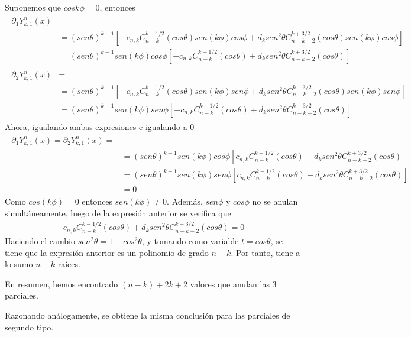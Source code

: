 Suponemos que $cos k\phi = 0 $, entonces
\begin{gather}
\begin{aligned}
 \partial_1  Y_{k,1}^n(x) &= \\ 
 &= (sen\theta)^{k-1}[-c_{n,k}C_{n-k}^{k-1/2}(cos \theta)sen(k\phi)cos\phi + d_k sen^2\theta C_{n-k-2}^{k+3/2}(cos \theta)sen(k\phi)cos\phi] \\ &= (sen\theta)^{k-1}sen(k\phi)cos\phi[-c_{n,k}C_{n-k}^{k-1/2}(cos \theta) + d_k sen^2\theta C_{n-k-2}^{k+3/2}(cos \theta)]
\end{aligned}
\end{gather}
\begin{gather}
\begin{aligned}
\partial_2  Y_{k,1}^n(x) &= \\ 
&= (sen\theta)^{k-1}[-c_{n,k}C_{n-k}^{k-1/2}(cos \theta)sen(k\phi)sen\phi + d_k sen^2\theta C_{n-k-2}^{k+3/2}(cos \theta)sen(k\phi)sen\phi] \\ &= (sen\theta)^{k-1}sen(k\phi)sen\phi[-c_{n,k}C_{n-k}^{k-1/2}(cos \theta) + d_k sen^2\theta C_{n-k-2}^{k+3/2}(cos \theta)]
\end{aligned}
\end{gather}
Ahora, igualando ambas expresiones e igualando a 0
\begin{gather}
\begin{aligned}
	\partial_1  Y_{k,1}^n(x) = \partial_2  Y_{k,1}^n(x) = \\ &= (sen\theta)^{k-1}sen(k\phi)cos\phi[c_{n,k}C_{n-k}^{k-1/2}(cos \theta) + d_k sen^2\theta C_{n-k-2}^{k+3/2}(cos \theta)]  \\ &= (sen\theta)^{k-1}sen(k\phi)sen\phi[c_{n,k}C_{n-k}^{k-1/2}(cos \theta) + d_k sen^2\theta C_{n-k-2}^{k+3/2}(cos \theta)] \\ &= 0
\end{aligned}
\end{gather}
Como $cos (k\phi) = 0 $ entonces $sen  (k\phi) \neq 0$. Además, $sen \phi$ y $cos\phi$ no se anulan simultáneamente, luego de la expresión anterior se verifica que
\begin{gather}
c_{n,k}C_{n-k}^{k-1/2}(cos \theta) + d_k sen^2\theta C_{n-k-2}^{k+3/2}(cos \theta) = 0
\end{gather}
Haciendo el cambio $sen^2 \theta = 1-cos^2\theta$, y tomando como variable $t=cos\theta$, se tiene que la expresión anterior es un polinomio de grado $n-k$. Por tanto, tiene a lo sumo $n-k$ raíces.

\medskip

En resumen, hemos encontrado $(n-k)+2k+2$ valores que anulan las 3 parciales.

\medskip
Razonando análogamente, se obtiene la misma conclusión para las parciales de segundo tipo.